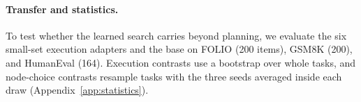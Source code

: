 
\paragraph{Transfer and statistics.} To test whether the learned search carries beyond planning, we evaluate the six small-set execution adapters and the base on FOLIO \citep{han2022folio} (200 items), GSM8K \citep{cobbe2021gsm8k} (200), and HumanEval \citep{chen2021humaneval} (164). Execution contrasts use a bootstrap over whole tasks, and node-choice contrasts resample tasks with the three seeds averaged inside each draw (Appendix~\ref{app:statistics}).

